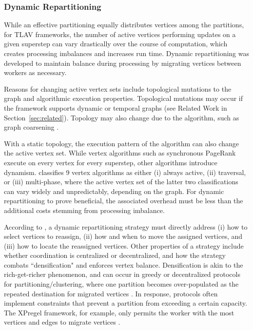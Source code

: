 \documentclass[reprint,twocolumn,showpacs,preprintnumbers,amsmath, aps,pre,amssymb]{revtex4-1}
\begin{document}
\subsubsection{Dynamic Repartitioning}
\label{subsubsec:dyn_repart}

While an effective partitioning equally distributes vertices among the partitions, for TLAV frameworks, the number of active vertices performing updates on a given superstep can vary drastically over the course of computation, which creates processing imbalances and increases run time.  Dynamic repartitioning was developed to maintain balance during processing by migrating vertices between workers as necessary.

Reasons for changing active vertex sets include topological mutations to the graph and algorithmic execution properties.  Topological mutations may occur if the framework supports dynamic or temporal graphs (see Related Work in Section~\ref{sec:related}).  Topology may also change due to the algorithm, such as graph coarsening \cite{Wang2014}.  

With a static topology, the execution pattern of the algorithm can also change the active vertex set.  While vertex algorithms such as synchronous PageRank execute on every vertex for every superstep, other algorithms introduce dynamism.  \cite{Shang2013} classifies 9 vertex algorithms as either (i) always active, (ii) traversal, or (iii) multi-phase, where the active vertex set of the latter two classifications can vary widely and unpredictably, depending on the graph.  For dynamic repartitioning to prove beneficial, the associated overhead must be less than the additional costs stemming from processing imbalance.

According to \cite{Salihoglu2013}, a dynamic repartitioning strategy must directly address (i) how to select vertices to reassign, (ii) how and when to move the assigned vertices, and (iii) how to locate the reassigned vertices.  Other properties of a strategy include whether coordination is centralized or decentralized, and how the strategy combats ``densification" and enforces vertex balance.  Densification is akin to the rich-get-richer phenomenon, and can occur in greedy or decentralized protocols for partitioning/clustering, where one partition becomes over-populated as the repeated destination for migrated vertices \cite{Vaquero2013a}.  In response, protocols often implement constraints that prevent a partition from exceeding a certain capacity.  The XPregel framework, for example, only permits the worker with the most vertices and edges to migrate vertices \cite{Bao2013}.  
\end{document}
